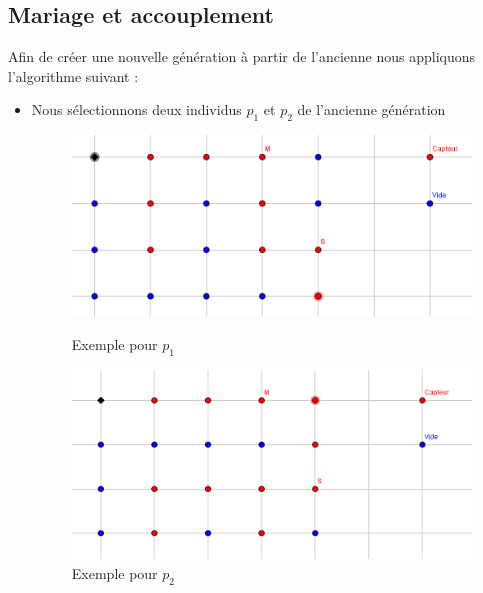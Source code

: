 \documentclass[12pt,a4paper]{article}
\begin{document}
\subsection{Mariage et accouplement}
Afin de créer une nouvelle génération à partir de l'ancienne nous appliquons l'algorithme suivant : 
\begin{itemize}
\item Nous sélectionnons deux individus $p_1$ et $p_2$ de l'ancienne génération
\begin{figure}[h]
\center
\includegraphics[scale=1]{Images/p_1.png}
\caption{Exemple pour $p_1$}
\includegraphics[scale=1]{Images/p_2.png}
\caption{Exemple pour $p_2$}
\end{figure}


\end{itemize}
\end{document}
